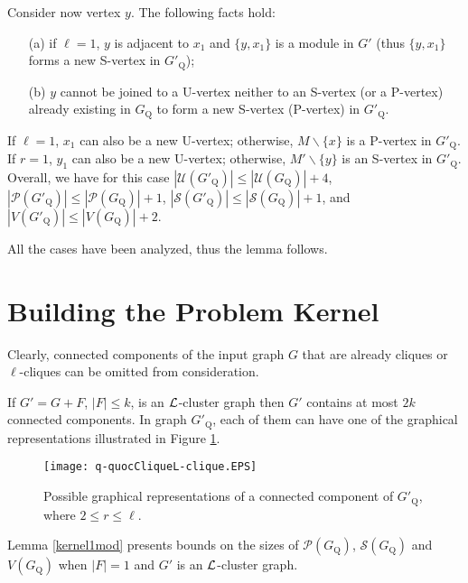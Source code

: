 \documentclass[12pt]{article}
\def\L{{\cal L}}
\begin{document}
Consider now vertex $y$. The following facts hold:
\begin{itemize}
\item[(a)] if $\ell=1$, $y$ is adjacent to $x_1$ and $\{y,x_1\}$ is a module in $G'$ (thus $\{y,x_1\}$ forms a new S-vertex in $G'_{\mathrm Q}$);

\item[(b)] $y$ cannot be joined to a U-vertex neither to an S-vertex (or a P-vertex) already existing in $G_{\mathrm Q}$  to form a new S-vertex (P-vertex) in $G'_{\mathrm Q}$.
\end{itemize}

If $\ell=1$, $x_1$ can also be a new U-vertex; otherwise, $M\backslash \{x\}$ is a P-vertex in $G'_{\mathrm Q}$. If $r=1$, $y_1$ can also be a new U-vertex; otherwise, $M'\backslash \{y\}$ is an S-vertex in $G'_{\mathrm Q}$.
Overall,
we have for this case
$|{\mathcal U}(G'_{\mathrm Q})| \leq |{\mathcal U}(G_{\mathrm Q})|+4$,
$|{\mathcal P}(G'_{\mathrm Q})| \leq |{\mathcal P}(G_{\mathrm Q})|+1$,
$|{\mathcal S}(G'_{\mathrm Q})| \leq |{\mathcal S}(G_{\mathrm Q})|+1$, and
$|V(G'_{\mathrm Q})|\leq|V(G_{\mathrm Q})|+2.$

\medskip

All the cases have been analyzed, thus the lemma follows. \hfill \framebox[.09in]

\bigskip

\section{Building the Problem Kernel} \label{sec4}


Clearly, connected components of the input graph $G$ that are
already cliques or $\ell$-cliques can be omitted from
consideration.

If $G' = G+F$, $|F|\leq k$, is an $\L$-cluster graph then $G'$ contains at
most $2k$ connected components. In graph $G'_{\mathrm Q}$, each of them
can have one of the graphical representations illustrated in
Figure \ref{q-quocCliqueBiclique}.

\begin{figure}[htb]
\centering
\texttt{[image: q-quocCliqueL-clique.EPS]}
\caption{\label{q-quocCliqueBiclique}Possible graphical
representations of a connected component of $G'_{\mathrm Q}$,
where $2 \leq r \leq \ell$.}
\end{figure}

Lemma \ref{kernel1mod} presents bounds on the sizes of ${\mathcal P}(G_{\mathrm Q})$,
${\mathcal S}(G_{\mathrm Q})$ and $V(G_{\mathrm Q})$ when $|F|=1$ and $G'$
is an $\L$-cluster graph.
\end{document}
